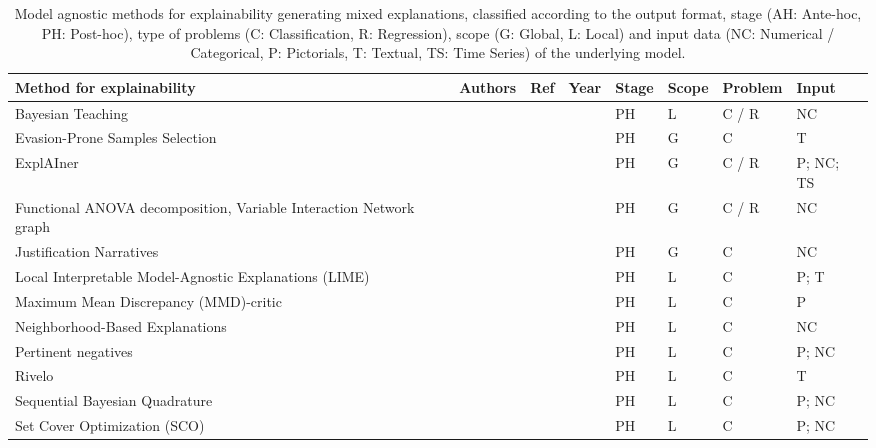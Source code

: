 \documentclass[final,1p,times]{elsarticle}
\begin{document}
\begin{table}[h!]
\centering
\footnotesize
    \caption{Model agnostic methods for explainability generating mixed explanations, classified according to the output format, stage (AH: Ante-hoc, PH: Post-hoc), type of problems (C: Classification, R: Regression), scope (G: Global, L: Local) and input data (NC: Numerical / Categorical, P: Pictorials, T: Textual, TS: Time Series) of the underlying model.}
    \label{tab:model-agnostic-mixed}
    \begin{tabular}{m{4.2cm} m{2.4cm} m{0.5cm} m{0.5cm} m{0.5cm} m{0.6cm} m{0.8cm} m{0.8cm}}
    \hline
    Method for explainability & Authors & Ref & Year & Stage & Scope & Problem & Input\\
    \hline
    Bayesian Teaching & \citeauthor{yang2017explainable} & \cite{yang2017explainable} & \citeyear{yang2017explainable} & PH & L & C / R & NC\\
    Evasion-Prone Samples Selection & \citeauthor{liu2018adversarial} & \cite{liu2018adversarial} & \citeyear{liu2018adversarial} & PH & G & C & T\\
    ExplAIner & \citeauthor{spinner2019explainer} & \cite{spinner2019explainer} & \citeyear{spinner2019explainer} & PH & G & C / R & P; NC; TS\\
    Functional ANOVA decomposition, Variable Interaction Network graph &  \citeauthor{hooker2004discovering} &  \cite{hooker2004discovering} &  \citeyear{hooker2004discovering} & PH & G & C / R & NC\\
    Justification Narratives & \citeauthor{biran2014justification} & \cite{biran2014justification} &  \citeyear{biran2014justification} & PH & G & C & NC\\
    Local Interpretable Model-Agnostic Explanations (LIME) &  \citeauthor{ribeiro2016model} &  \cite{ribeiro2016model,ribeiro2016should} & \citeyear{ribeiro2016model} & PH & L & C & P; T\\
    Maximum Mean Discrepancy (MMD)-critic & \citeauthor{kim2016examples} & \cite{kim2016examples} & \citeyear{kim2016examples} & PH & L & C & P\\
    Neighborhood-Based Explanations & \citeauthor{caruana1999case} & \cite{caruana1999case} & \citeyear{caruana1999case} & PH & L & C & NC\\
    Pertinent negatives & \citeauthor{dhurandhar2018explanations} & \cite{dhurandhar2018explanations} & \citeyear{dhurandhar2018explanations} & PH & L & C & P; NC\\
    Rivelo & \citeauthor{tamagnini2017interpreting} & \cite{tamagnini2017interpreting} & \citeyear{tamagnini2017interpreting} & PH & L & C & T\\
    Sequential Bayesian Quadrature & \citeauthor{khanna2019interpreting} & \cite{khanna2019interpreting} &  \citeyear{khanna2019interpreting} & PH & L & C & P; NC\\
    Set Cover Optimization (SCO) & \citeauthor{bien2011prototype} & \cite{bien2011prototype} & \citeyear{bien2011prototype} & PH & L & C & P; NC\\
    \hline
\end{tabular}
\end{table}
\end{document}
